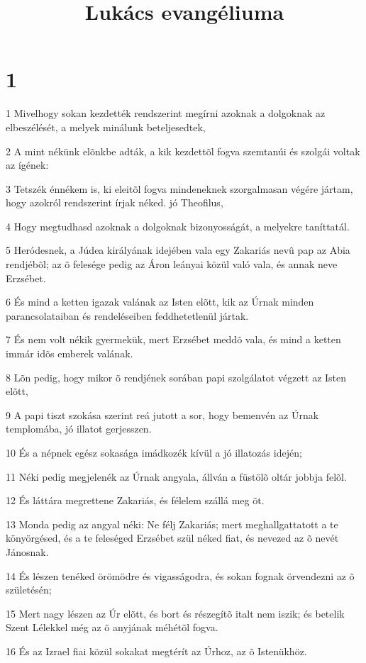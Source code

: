 

\title{Lukács evangéliuma}


\chapter{1}

\par 1 Mivelhogy sokan kezdették rendszerint megírni azoknak a dolgoknak az elbeszélését, a melyek minálunk beteljesedtek,
\par 2 A mint nékünk elõnkbe adták, a kik kezdettõl fogva szemtanúi és szolgái voltak az ígének:
\par 3 Tetszék énnékem is, ki eleitõl fogva mindeneknek szorgalmasan végére jártam, hogy azokról rendszerint írjak néked. jó Theofilus,
\par 4 Hogy megtudhasd azoknak a dolgoknak bizonyosságát, a melyekre taníttatál.
\par 5 Heródesnek, a Júdea királyának idejében vala egy Zakariás nevû pap az Abia rendjébõl; az õ felesége pedig az Áron leányai közül való vala, és annak neve Erzsébet.
\par 6 És mind a ketten igazak valának az Isten elõtt, kik az Úrnak minden parancsolataiban és rendeléseiben feddhetetlenül jártak.
\par 7 És nem volt nékik gyermekük, mert Erzsébet meddõ vala, és mind a ketten immár idõs emberek valának.
\par 8 Lõn pedig, hogy mikor õ rendjének sorában papi szolgálatot végzett az Isten elõtt,
\par 9 A papi tiszt szokása szerint reá jutott a sor, hogy bemenvén az Úrnak templomába, jó illatot gerjesszen.
\par 10 És a népnek egész sokasága imádkozék kívül a jó illatozás idején;
\par 11 Néki pedig megjelenék az Úrnak angyala, állván a füstölõ oltár jobbja felõl.
\par 12 És láttára megrettene Zakariás, és félelem szállá meg õt.
\par 13 Monda pedig az angyal néki: Ne félj Zakariás; mert meghallgattatott a te könyörgésed, és a te feleséged Erzsébet szül néked fiat, és nevezed az õ nevét Jánosnak.
\par 14 És lészen tenéked örömödre és vigasságodra, és sokan fognak örvendezni az õ születésén;
\par 15 Mert nagy lészen az Úr elõtt, és bort és részegítõ italt nem iszik; és betelik Szent Lélekkel még az õ anyjának méhétõl fogva.
\par 16 És az Izrael fiai közül sokakat megtérít az Úrhoz, az õ Istenükhöz.
